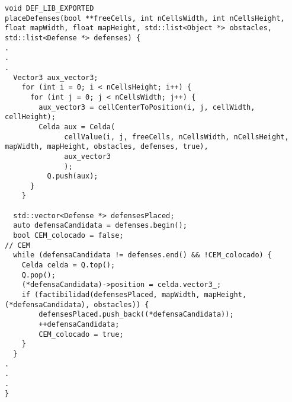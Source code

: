 \begin{lstlisting}
void DEF_LIB_EXPORTED
placeDefenses(bool **freeCells, int nCellsWidth, int nCellsHeight, float mapWidth, float mapHeight, std::list<Object *> obstacles, std::list<Defense *> defenses) {
.
.
.
  Vector3 aux_vector3;
    for (int i = 0; i < nCellsHeight; i++) {
      for (int j = 0; j < nCellsWidth; j++) {
        aux_vector3 = cellCenterToPosition(i, j, cellWidth, cellHeight);
        Celda aux = Celda(
              cellValue(i, j, freeCells, nCellsWidth, nCellsHeight, mapWidth, mapHeight, obstacles, defenses, true),
              aux_vector3
              );
          Q.push(aux);
      }
    }

  std::vector<Defense *> defensesPlaced;
  auto defensaCandidata = defenses.begin();
  bool CEM_colocado = false;
// CEM
  while (defensaCandidata != defenses.end() && !CEM_colocado) {
    Celda celda = Q.top();
    Q.pop();
    (*defensaCandidata)->position = celda.vector3_;
    if (factibilidad(defensesPlaced, mapWidth, mapHeight, (*defensaCandidata), obstacles)) {
        defensesPlaced.push_back((*defensaCandidata));
        ++defensaCandidata;
        CEM_colocado = true;
    }
  }
.
.
.
}
\end{lstlisting}